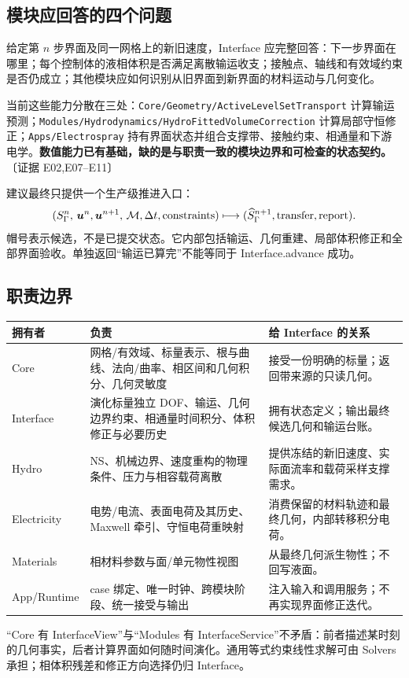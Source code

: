 \documentclass[UTF8,a4paper,11pt,fontset=fandol]{ctexart}
\newcommand{\code}[1]{\nolinkurl{#1}}
\newcommand{\ev}[1]{{\small\color{muted}〔证据 #1〕}}
\newcommand{\uu}{\bm u}\newcommand{\nn}{\bm n}\newcommand{\xx}{\bm x}
\begin{document}
\subsection{模块应回答的四个问题}
给定第 $n$ 步界面及同一网格上的新旧速度，Interface 应完整回答：下一步界面在哪里；每个控制体的液相体积是否满足离散输运收支；接触点、轴线和有效域约束是否仍成立；其他模块应如何识别从旧界面到新界面的材料运动与几何变化。

当前这些能力分散在三处：\code{Core/Geometry/ActiveLevelSetTransport} 计算输运预测；\code{Modules/Hydrodynamics/HydroFittedVolumeCorrection} 计算局部守恒修正；\code{Apps/Electrospray} 持有界面状态并组合支撑带、接触约束、相通量和下游电学。\textbf{数值能力已有基础，缺的是与职责一致的模块边界和可检查的状态契约。}\ev{E02,E07--E11}

建议最终只提供一个生产级推进入口：
\[
  (S_\Gamma^n,\,\uu^n,\uu^{n+1},\,\mathcal M,\dt,\text{constraints})
  \longmapsto (\widehat S_\Gamma^{n+1},\text{transfer},\text{report}).
\]
帽号表示候选，不是已提交状态。它内部包括输运、几何重建、局部体积修正和全部界面验收。单独返回“输运已算完”不能等同于 Interface.advance 成功。

\subsection{职责边界}
\begin{longtable}{@{}P{.15\textwidth}P{.43\textwidth}P{.36\textwidth}@{}}
\toprule 拥有者 & 负责 & 给 Interface 的关系\\\midrule\endhead
Core & 网格/有效域、标量表示、根与曲线、法向/曲率、相区间和几何积分、几何灵敏度 & 接受一份明确的标量；返回带来源的只读几何。\\
Interface & 演化标量独立 DOF、输运、几何边界约束、相通量时间积分、体积修正与必要历史 & 拥有状态定义；输出最终候选几何和输运台账。\\
Hydro & NS、机械边界、速度重构的物理条件、压力与相容载荷离散 & 提供冻结的新旧速度、实际面流率和载荷采样支撑需求。\\
Electricity & 电势/电流、表面电荷及其历史、Maxwell 牵引、守恒电荷重映射 & 消费保留的材料轨迹和最终几何，内部转移积分电荷。\\
Materials & 相材料参数与面/单元物性视图 & 从最终几何派生物性；不回写液面。\\
App/Runtime & case 绑定、唯一时钟、跨模块阶段、统一接受与输出 & 注入输入和调用服务；不再实现界面修正迭代。\\
\bottomrule
\end{longtable}
“Core 有 InterfaceView”与“Modules 有 InterfaceService”不矛盾：前者描述某时刻的几何事实，后者计算界面如何随时间演化。通用等式约束线性求解可由 Solvers 承担；相体积残差和修正方向选择仍归 Interface。
\end{document}
